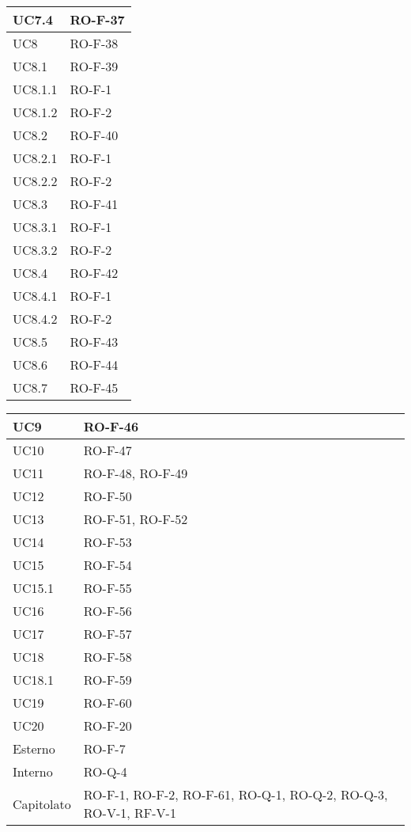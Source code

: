 \begin{center}
\begin{tabular}{ |m{8em}|m{13em}| }
    \hline
    UC7.4       &   RO-F-37 \\
    \hline
    UC8         &   RO-F-38 \\
    \hline
    UC8.1       &   RO-F-39 \\
    \hline
    UC8.1.1     &   RO-F-1 \\
    \hline
    UC8.1.2     &   RO-F-2 \\
    \hline
    UC8.2       &   RO-F-40 \\
    \hline
    UC8.2.1     &   RO-F-1 \\
    \hline
    UC8.2.2     &   RO-F-2 \\
    \hline
    UC8.3       &   RO-F-41 \\
    \hline
    UC8.3.1     &   RO-F-1 \\
    \hline
    UC8.3.2     &   RO-F-2 \\
    \hline
    UC8.4       &   RO-F-42 \\
    \hline
    UC8.4.1     &   RO-F-1 \\
    \hline
    UC8.4.2     &   RO-F-2 \\
    \hline
    UC8.5       &   RO-F-43 \\
    \hline
    UC8.6       &   RO-F-44 \\
    \hline
    UC8.7       &   RO-F-45 \\
    \hline
    \end{tabular}
    \newpage
    \begin{tabular}{ |m{8em}|m{13em}| }
    \hline
    UC9         &   RO-F-46 \\
    \hline
    UC10        &   RO-F-47 \\
    \hline
    UC11        &   RO-F-48, RO-F-49 \\
    \hline
    UC12        &   RO-F-50 \\
    \hline
    UC13        &   RO-F-51, RO-F-52 \\
    \hline
    UC14        &   RO-F-53 \\
    \hline
    UC15        &   RO-F-54 \\
    \hline
    UC15.1      &   RO-F-55 \\
    \hline
    UC16        &   RO-F-56 \\
    \hline
    UC17        &   RO-F-57 \\
    \hline
    UC18        &   RO-F-58 \\
    \hline
    UC18.1      &   RO-F-59 \\
    \hline
    UC19        &   RO-F-60 \\
    \hline
    UC20        &   RO-F-20 \\
    \hline
    Esterno     &   RO-F-7 \\
    \hline
    Interno     &   RO-Q-4 \\
    \hline
    Capitolato  &   RO-F-1, RO-F-2, RO-F-61, RO-Q-1, RO-Q-2, RO-Q-3, RO-V-1, RF-V-1 \\
    \hline
\end{tabular}
\end{center}
